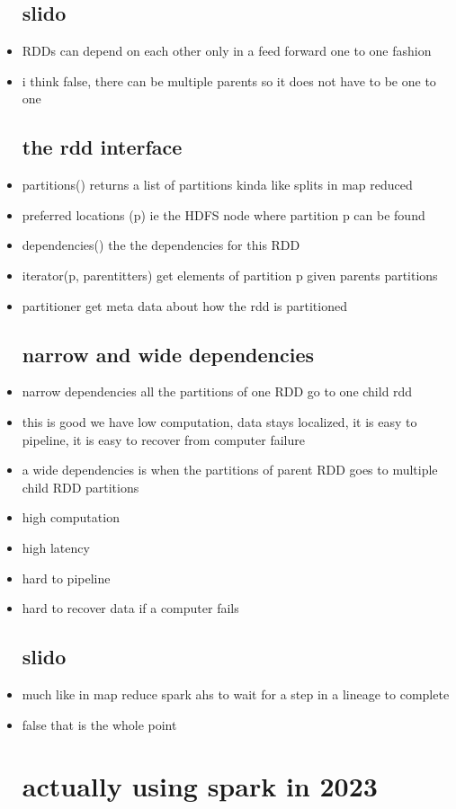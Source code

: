 \documentclass{article}
\begin{document}
\begin{itemize}
\subsection*{slido}
\item RDDs can depend on each other only in a feed forward one to one fashion 
\item i think false, there can be multiple parents so it does not have to be one to one 
\subsection*{the rdd interface}
\item partitions() returns a list of partitions kinda like splits in map reduced 
\item preferred locations (p) ie the HDFS node where partition p can be found
\item dependencies() the the dependencies for this RDD
\item iterator(p, parentitters) get elements of partition p given parents partitions
\item partitioner  get meta data about how the rdd  is partitioned
\subsection*{narrow and wide dependencies}
\item narrow dependencies all the partitions of one RDD go to one child rdd 
\item this is good we have low computation, data stays localized, it is easy to pipeline, it is easy to recover from computer failure
\item a wide dependencies is when the partitions of parent RDD goes to multiple child RDD partitions
\item high computation
\item high latency
\item hard to pipeline 
\item hard to recover data if a computer fails
\subsection*{slido}
\item much like in map reduce spark ahs to wait for a step in a lineage to complete 
\item false that is the whole point 
\section*{actually using spark in 2023}

\end{itemize}
\end{document}

